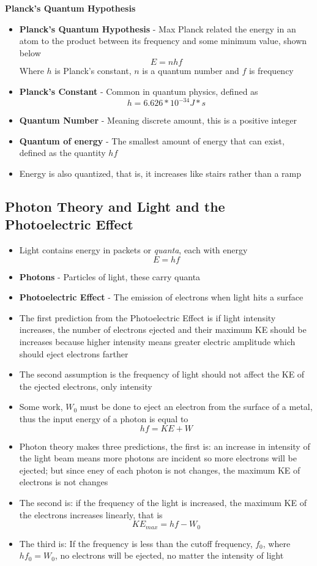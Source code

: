 \textbf{Planck's Quantum Hypothesis}
\begin{itemize}
    \item \textbf{Planck's Quantum Hypothesis} - Max Planck related the energy in an atom to the product between its frequency and some minimum value, shown below \[E=nhf\] Where \(h\) is Planck's constant, \(n\) is a quantum number and \(f\) is frequency
    \item \textbf{Planck's Constant} - Common in quantum physics, defined as \[h=6.626*10^{-34}J*s\]
    \item \textbf{Quantum Number} - Meaning discrete amount, this is a positive integer
    \item \textbf{Quantum of energy} - The smallest amount of energy that can exist, defined as the quantity \(hf\)
    \item Energy is also quantized, that is, it increases like stairs rather than a ramp
\end{itemize}

\subsection{Photon Theory and Light and the Photoelectric Effect}
\begin{itemize}
    \item Light contains energy in packets or \emph{quanta}, each with energy \[E=hf\]
    \item \textbf{Photons} - Particles of light, these carry quanta
    \item \textbf{Photoelectric Effect} - The emission of electrons when light hits a surface
    \item The first prediction from the Photoelectric Effect is if light intensity increases, the number of electrons ejected and their maximum KE should be increases because higher intensity means greater electric amplitude which should eject electrons farther
    \item The second assumption is the frequency of light should not affect the KE of the ejected electrons, only intensity
    \item Some work, \(W_0\) must be done to eject an electron from the surface of a metal, thus the input energy of a photon is equal to \[hf=KE+W\]
    \item Photon theory makes three predictions, the first is: an increase in intensity of the light beam means more photons are incident so more electrons will be ejected; but since eney of each photon is not changes, the maximum KE of electrons is not changes
    \item The second is: if the frequency of the light is increased, the maximum KE of the electrons increases linearly, that is \[KE_{max}=hf-W_0\]
    \item The third is: If the frequency is less than the cutoff frequency, \(f_0\), where \(hf_0=W_0\), no electrons will be ejected, no matter the intensity of light
\end{itemize}

